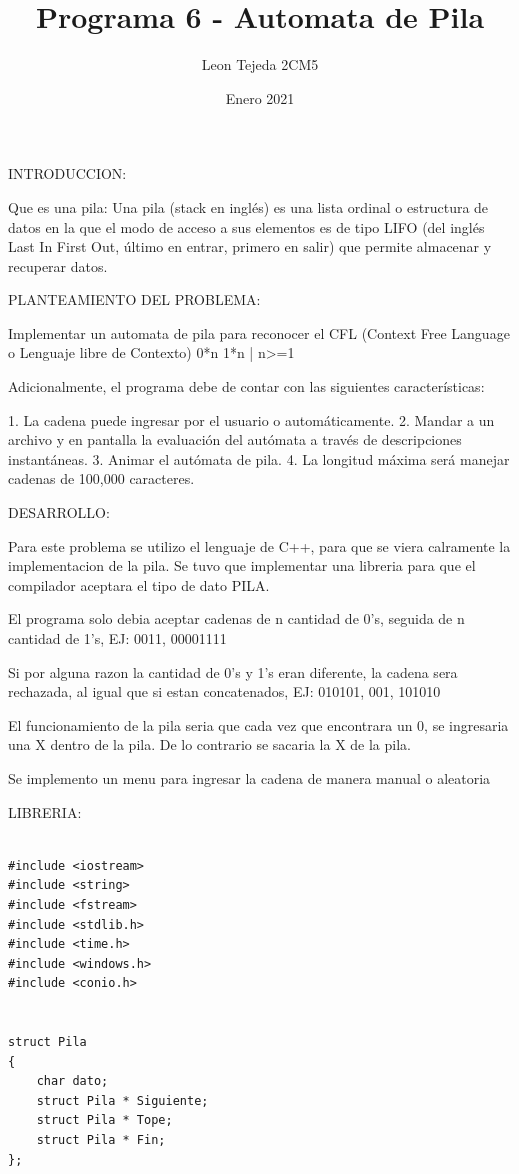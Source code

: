 \documentclass[a4paper]{report}
\title{Programa 6 - Automata de Pila}
\author{Leon Tejeda 2CM5}
\date{Enero 2021}
\begin{document}
\maketitle
\begin{flushleft}
INTRODUCCION:

Que es una pila:  Una pila (stack en inglés) es una lista ordinal o estructura de datos en la que el modo de acceso a sus elementos es de tipo LIFO (del inglés Last In First Out, último en entrar, primero en salir) que permite almacenar y recuperar datos.


PLANTEAMIENTO DEL PROBLEMA:

Implementar un automata de pila para reconocer el CFL (Context Free Language o Lenguaje libre de Contexto) {0*n 1*n | n>=1}

Adicionalmente, el programa debe de contar con las siguientes características:

1. La cadena puede ingresar por el usuario o automáticamente.
2. Mandar a un archivo y en pantalla la evaluación del autómata a través de descripciones instantáneas.
3. Animar el autómata de pila.
4. La longitud máxima será manejar cadenas de 100,000 caracteres.

DESARROLLO:

Para este problema se utilizo el lenguaje de C++, para que se viera calramente la implementacion de la pila. Se tuvo que implementar una libreria para que el compilador aceptara el tipo de dato PILA.

El programa solo debia aceptar cadenas de n cantidad de 0's, seguida de n cantidad de 1's, EJ:
0011, 00001111

Si por alguna razon la cantidad de 0's y 1's eran diferente, la cadena sera rechazada, al igual que si estan concatenados, EJ:
010101, 001, 101010

El funcionamiento de la pila seria que cada vez que encontrara un 0, se ingresaria una X dentro de la pila. De lo contrario se sacaria la X de la pila.

Se implemento un menu para ingresar la cadena de manera manual o aleatoria

\newpage

LIBRERIA:

\begin{lstlisting}

#include <iostream>
#include <string>
#include <fstream>
#include <stdlib.h>
#include <time.h>
#include <windows.h>
#include <conio.h>


struct Pila
{
	char dato;
	struct Pila * Siguiente;
	struct Pila * Tope;
	struct Pila * Fin;	
};


\end{lstlisting}
\end{flushleft}
\end{document}
